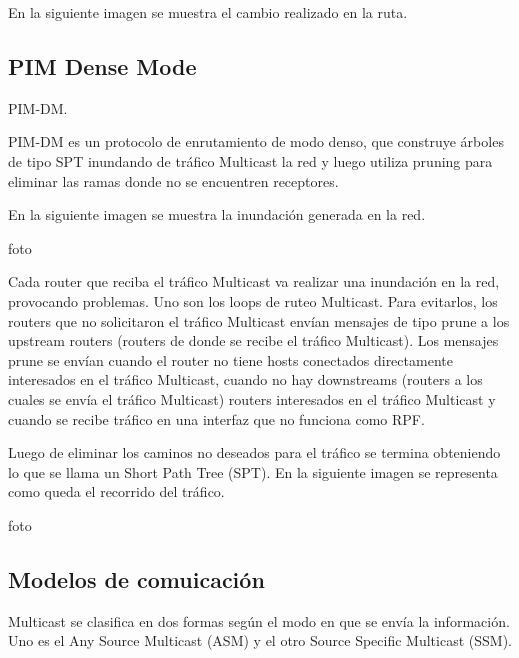 \documentclass[12pt,a4paper,oneside]{book}
\begin{document}
\vspace{0.5cm}

En la siguiente imagen se muestra el cambio realizado en la ruta.


\subsection{PIM Dense Mode}
\label{pimdm}

PIM-DM.

\vspace{0.5cm}

PIM-DM es un protocolo de enrutamiento de modo denso, que construye árboles de tipo SPT inundando de tráfico Multicast la red y luego utiliza  pruning para eliminar las ramas donde no se encuentren receptores. 

\vspace{0.5cm}

En la siguiente imagen se muestra la inundación generada en la red.

foto

Cada router que reciba el tráfico Multicast va realizar una inundación en la red, provocando problemas. Uno son los loops de ruteo Multicast. Para evitarlos, los routers que no solicitaron el tráfico Multicast envían mensajes de tipo prune a los upstream routers (routers de donde se recibe el tráfico Multicast). Los mensajes prune se envían cuando el router no tiene hosts conectados directamente interesados en el tráfico Multicast, cuando no hay downstreams (routers a los cuales se envía el tráfico Multicast) routers interesados en el tráfico Multicast y cuando se recibe tráfico en una interfaz que no funciona como RPF.

\vspace{0.5cm}

Luego de eliminar los caminos no deseados para el tráfico se termina obteniendo lo que se llama un Short Path Tree (SPT). En la siguiente imagen se representa como queda el recorrido del tráfico.


foto

\subsection{Modelos de comuicación}

Multicast se clasifica en dos formas según el modo en que se envía la información. Uno es el Any Source Multicast (ASM) y el otro Source Specific Multicast (SSM). 

\vspace{0.5cm}
\end{document}
